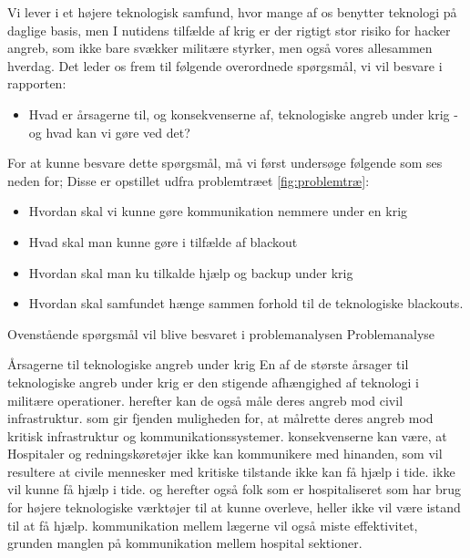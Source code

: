Vi lever i et højere teknologisk samfund, hvor mange af os benytter teknologi på daglige basis, men I nutidens tilfælde af krig er der rigtigt stor risiko for hacker angreb, som ikke bare svækker militære styrker, men også vores allesammen hverdag.
Det leder os frem til følgende overordnede spørgsmål, vi vil besvare i rapporten:

\begin{itemize}
    \item Hvad er årsagerne til, og konsekvenserne af, teknologiske angreb under krig - og hvad kan vi gøre ved det?
\end{itemize}

For at kunne besvare dette spørgsmål, må vi først undersøge følgende som ses neden for; Disse er opstillet udfra problemtræet \ref{fig:problemtræ}:
\begin{itemize}
    \item Hvordan skal vi kunne gøre kommunikation nemmere under en krig
    \item Hvad skal man kunne gøre i tilfælde af blackout
    \item Hvordan skal man ku tilkalde hjælp og backup under krig
    \item Hvordan skal samfundet hænge sammen forhold til de teknologiske blackouts.
\end{itemize}

Ovenstående spørgsmål vil blive besvaret i problemanalysen
Problemanalyse

Årsagerne til teknologiske angreb under krig
En af de største årsager til teknologiske angreb under krig er den stigende afhængighed af teknologi i militære operationer.
herefter kan de også måle deres angreb mod civil infrastruktur. som gir fjenden muligheden for, at målrette deres angreb mod kritisk infrastruktur og kommunikationssystemer. konsekvenserne kan være, at Hospitaler og redningskøretøjer ikke kan kommunikere med hinanden, som vil resultere at civile mennesker med kritiske tilstande ikke kan få hjælp i tide.
ikke vil kunne få hjælp i tide. og herefter også folk som er hospitaliseret som har brug for højere teknologiske værktøjer til at kunne overleve, heller ikke vil være istand til at få hjælp. kommunikation mellem lægerne vil også miste effektivitet, grunden manglen på kommunikation mellem hospital sektioner.
